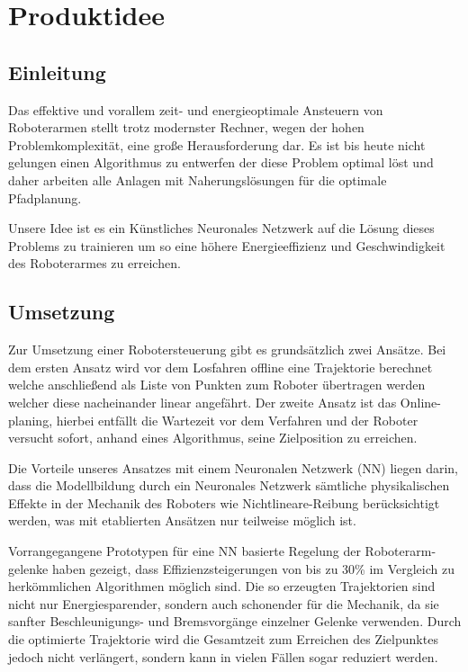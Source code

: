 \chapter{Produktidee}

\section{Einleitung}

Das effektive und vorallem zeit- und energieoptimale Ansteuern von Roboterarmen stellt trotz modernster Rechner, wegen der hohen Problemkomplexität, eine große Herausforderung dar. Es ist bis heute nicht gelungen einen Algorithmus zu entwerfen der diese Problem optimal löst und daher arbeiten alle Anlagen mit Naherungslösungen für die optimale Pfadplanung.

Unsere Idee ist es ein Künstliches Neuronales Netzwerk auf die Lösung dieses Problems zu trainieren um so eine höhere Energieeffizienz und Geschwindigkeit des Roboterarmes zu erreichen.

\section{Umsetzung}

Zur Umsetzung einer Robotersteuerung gibt es grundsätzlich zwei Ansätze. Bei dem ersten Ansatz wird vor dem Losfahren offline eine Trajektorie berechnet welche anschließend als Liste von Punkten zum Roboter übertragen werden welcher diese nacheinander linear angefährt. Der zweite Ansatz ist das Online-planing, hierbei entfällt die Wartezeit vor dem Verfahren und der Roboter versucht sofort, anhand eines Algorithmus, seine Zielposition zu erreichen. 

Die Vorteile unseres Ansatzes mit einem Neuronalen Netzwerk (NN) liegen darin, dass die Modellbildung durch ein Neuronales Netzwerk sämtliche physikalischen Effekte in der Mechanik des Roboters wie Nichtlineare-Reibung berücksichtigt werden, was mit etablierten Ansätzen nur teilweise möglich ist.

Vorrangegangene Prototypen für eine NN basierte Regelung der Roboterarm-gelenke haben gezeigt, dass Effizienzsteigerungen von bis zu 30\% im Vergleich zu herkömmlichen Algorithmen möglich sind. Die so erzeugten Trajektorien sind nicht nur Energiesparender, sondern auch schonender für die Mechanik, da sie sanfter Beschleunigungs- und Bremsvorgänge  einzelner Gelenke verwenden. Durch die optimierte Trajektorie wird die Gesamtzeit zum Erreichen des Zielpunktes jedoch nicht verlängert, sondern kann in vielen Fällen sogar reduziert werden.

